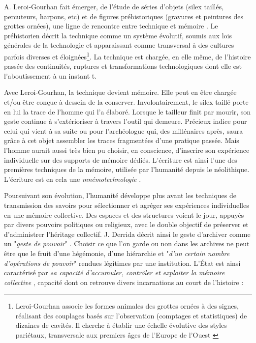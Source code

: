 \documentclass[symmetric,justified,marginals=raggedouter]{tufte-book}
\begin{document}
A. Leroi-Gourhan fait émerger, de l'étude de séries d'objets (silex taillés, percuteurs, harpons, etc) et de figures préhistoriques (gravures et peintures des grottes ornées), une ligne de rencontre entre technique et mémoire \citep{leroi-gourhan_geste_1964}. Le préhistorien décrit la technique comme un système évolutif, soumis aux lois générales de la technologie et apparaissant comme transversal à des cultures parfois diverses et éloignées\footnote{
Leroi-Gourhan associe les formes animales des grottes ornées à des signes, réalisant des couplages basés sur l'observation (comptages et statistiques) de dizaines de cavités. Il cherche à établir une échelle évolutive des styles pariétaux, transversale aux premiers âges de l'Europe de l'Ouest \citep{leroi-gourham_art_1984}}. La technique est chargée, en elle même, de l'histoire passée des continuités, ruptures et transformations technologiques dont elle est l'aboutissement à un instant t.   

Avec Leroi-Gourhan, la technique devient mémoire. Elle peut en être chargée et/ou être conçue à dessein de la conserver. Involontairement, le silex taillé porte en lui la trace de l'homme qui l'a élaboré. Lorsque le tailleur finit par mourir, son geste continue à s'extérioriser à travers l'outil qui demeure. Précieux indice pour celui qui vient à sa suite ou pour l'archéologue qui, des millénaires après, saura grâce à cet objet assembler les traces fragmentées d'une pratique passée. Mais l'homme aurait aussi très bien pu choisir, en conscience, d'inscrire son expérience individuelle sur des supports de mémoire dédiés. L'écriture est ainsi l'une des premières techniques de la mémoire, utilisée par l'humanité depuis le néolithique. L'écriture est en cela une \textit{mnémotechnologie} \citep{stiegler_leroi-gourhan:_1998}. 

Poursuivant son évolution, l'humanité développe plus avant les techniques de transmission des savoirs pour sélectionner et agréger ses expériences individuelles en une mémoire collective. Des espaces et des structures voient le jour, appuyés par divers pouvoirs politiques ou religieux, avec le double objectif de préserver et d'administrer l'héritage collectif. J. Derrida décrit ainsi le geste d'archiver comme un "\textit{geste de pouvoir}" \citep{derrida_trace_2014}. Choisir ce que l'on garde ou non dans les archives ne peut être que le fruit d'une hégémonie, d'une hiérarchie et "\textit{d'un certain nombre d'opérations de pouvoir}" rendues légitimes par une institution. L'État est ainsi caractérisé par \textit{sa capacité d'accumuler, contrôler et exploiter la mémoire collective} \citep{stiegler_etat_1991}, capacité dont on retrouve divers incarnations au court de l'histoire :
\end{document}
